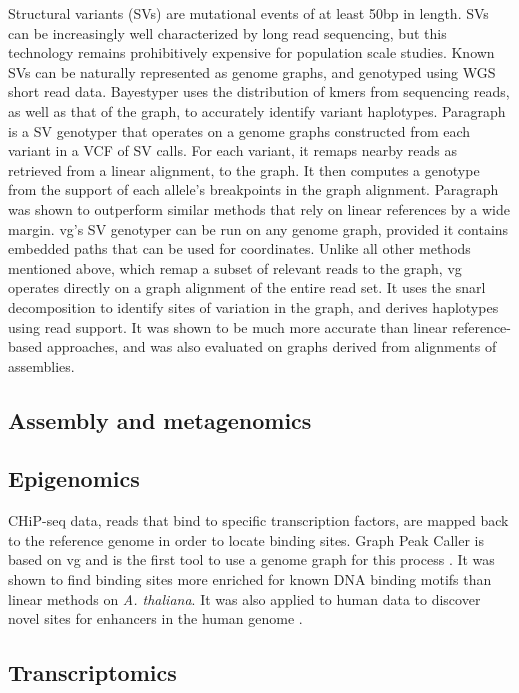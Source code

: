 Structural variants (SVs) are mutational events of at least 50bp in length.
SVs can be increasingly well characterized by long read sequencing, but this technology remains prohibitively expensive for population scale studies.
Known SVs can be naturally represented as genome graphs, and genotyped using WGS short read data.
Bayestyper \cite{sibbesen2018accurate} uses the distribution of kmers from sequencing reads, as well as that of the graph, to accurately identify variant haplotypes.  
Paragraph \cite{chen2019paragraph} is a SV genotyper that operates on a genome graphs constructed from each variant in a VCF of SV calls.
For each variant, it remaps nearby reads as retrieved from a linear alignment, to the graph.
It then computes a genotype from the support of each allele's breakpoints in the graph alignment.
Paragraph was shown to outperform similar methods that rely on linear references by a wide margin.
vg's SV \cite{hickey2019genotyping} genotyper can be run on any genome graph, provided it contains embedded paths that can be used for coordinates.
Unlike all other methods mentioned above, which remap a subset of relevant reads to the graph, vg operates directly on a graph alignment of the entire read set.
It uses the snarl decomposition \cite{paten2018superbubbles} to identify sites of variation in the graph, and derives haplotypes using read support.
It was shown to be much more accurate than linear reference-based approaches, and was also evaluated on graphs derived from alignments of assemblies.

\subsection{Assembly and metagenomics}

\subsection{Epigenomics}

CHiP-seq data, reads that bind to specific transcription factors, are mapped back to the reference genome in order to locate binding sites.  
Graph Peak Caller is based on vg and is the first tool to use a genome graph for this process \cite{Grytten_2019}.
It was shown to find binding sites more enriched for known DNA binding motifs than linear methods on \emph{A. thaliana}.
It was also applied to human data to discover novel sites for enhancers in the human genome \cite{groza2019personalized}. 

\subsection{Transcriptomics}

